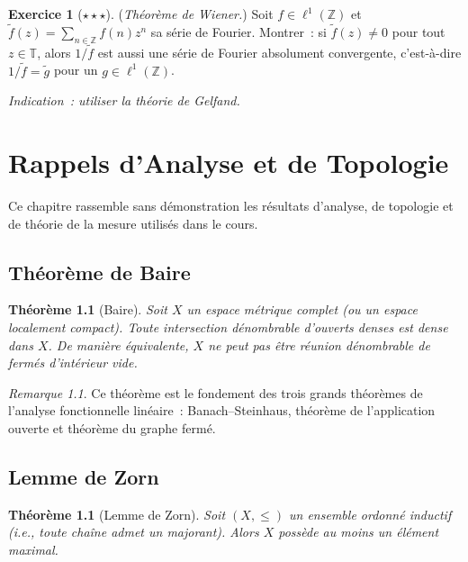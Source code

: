 \documentclass[a4paper,12pt]{book}
\newcommand{\Z}{\mathbb{Z}}
\theoremstyle{definition}
\newtheorem{exercice}{Exercice}[chapter]
\theoremstyle{plain}
\newtheorem{theoreme}[definition]{Théorème}
\theoremstyle{remark}
\newtheorem{remarque}[definition]{Remarque}
\begin{document}
\begin{exercice}[$\star\star\star$]
(\emph{Théorème de Wiener.}) Soit $f \in \ell^1(\Z)$ et
$\tilde f(z) = \sum_{n \in \Z} f(n)z^n$ sa série de Fourier. Montrer~: si $\tilde f(z) \neq 0$
pour tout $z \in \mathbb{T}$, alors $1/\tilde f$ est aussi une série de Fourier absolument
convergente, c'est-à-dire $1/\tilde f = \tilde g$ pour un $g \in \ell^1(\Z)$.

\emph{Indication~: utiliser la théorie de Gelfand.}
\end{exercice}


\appendix
\chapter{Rappels d'Analyse et de Topologie}
\label{app:rappels}
\minitoc

Ce chapitre rassemble sans démonstration les résultats d'analyse, de topologie et de
théorie de la mesure utilisés dans le cours.

\section{Théorème de Baire}

\begin{theoreme}[Baire]
\label{thm:baire-rappel}
Soit $X$ un espace métrique complet (ou un espace localement compact). Toute intersection
dénombrable d'ouverts denses est dense dans $X$. De manière équivalente, $X$ ne peut pas
être réunion dénombrable de fermés d'intérieur vide.
\end{theoreme}

\begin{remarque}
Ce théorème est le fondement des trois grands théorèmes de l'analyse fonctionnelle
linéaire~: Banach--Steinhaus, théorème de l'application ouverte et théorème du graphe
fermé.
\end{remarque}

\section{Lemme de Zorn}

\begin{theoreme}[Lemme de Zorn]
\label{thm:zorn}
Soit $(X, \le)$ un ensemble ordonné inductif (i.e., toute chaîne admet un majorant).
Alors $X$ possède au moins un élément maximal.
\end{theoreme}
\end{document}
